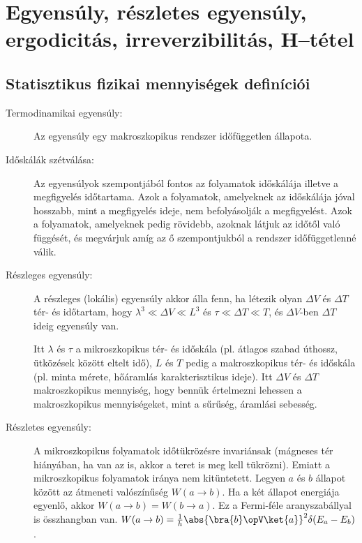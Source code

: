 \chapter{Egyens\'uly, r\'eszletes egyens\'uly, ergodicit\'as, irreverzibilit\'as, H--t\'etel}\label{B1tetel}
 
 \section{Statisztikus fizikai mennyiségek definíciói}
  
  \begin{description}
   \item[Termodinamikai egyensúly:]
    
    Az egyensúly egy makroszkopikus rendszer időfüggetlen állapota. 
   
   \item[Időskálák szétválása:]
    
    Az egyensúlyok szempontjából fontos az folyamatok időskálája illetve a megfigyelés időtartama.
   Azok a folyamatok, amelyeknek az időskálája jóval hosszabb, mint a megfigyelés ideje, nem befolyásolják a megfigyelést.
   Azok a folyamatok, amelyeknek pedig rövidebb, azoknak látjuk az időtől való függését, és megvárjuk amíg az ő szempontjukból a rendszer időfüggetlenné válik. 
   
   \item[Részleges egyensúly:]
    
    A részleges (lokális) egyensúly akkor álla fenn, ha létezik olyan $\Delta V$ és $\Delta T$ tér- és időtartam, hogy $\lambda^3\ll\Delta V\ll L^3$ és $\tau\ll \Delta T\ll T$, és $\Delta V$-ben $\Delta T$ ideig egyensúly van. 
    
    Itt $\lambda$ és $\tau$ a mikroszkopikus tér- és időskála (pl. átlagos szabad úthossz, ütközések között eltelt idő), $L$ és $T$ pedig a makroszkopikus tér- és időskála (pl. minta mérete, hőáramlás karakterisztikus ideje).
   Itt $\Delta V$ és $\Delta T$ makroszkopikus mennyiség, hogy bennük értelmezni lehessen a makroszkopikus mennyiségeket, mint a sűrűség, áramlási sebesség. 
    
   \item[Részletes egyensúly:]
    
    A mikroszkopikus folyamatok időtükrözésre invariánsak (mágneses tér hiányában, ha van az is, akkor a teret is meg kell tükrözni).
   Emiatt a mikroszkopikus folyamatok iránya nem kitüntetett.
   Legyen $a$ és $b$ állapot között az átmeneti valószínűség $W(a\to b)$.
   Ha a két állapot energiája egyenlő, akkor $W(a\to b)=W(b\to a)$.
   Ez a Fermi-féle aranyszabállyal is összhangban van. $W(a\to b)=\frac{1}{h}\abs{\bra{b}\opV\ket{a}}^2\delta(E_a-E_b)$.
    

\end{description}
